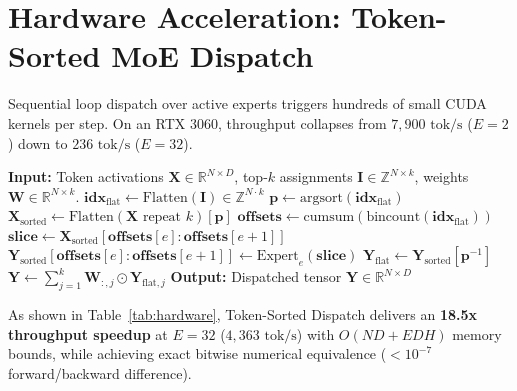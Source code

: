 \documentclass[10pt,twocolumn,letterpaper]{article}
\begin{document}
\section{Hardware Acceleration: Token-Sorted MoE Dispatch}
Sequential loop dispatch over active experts triggers hundreds of small CUDA kernels per step. On an RTX 3060, throughput collapses from $7,900\text{ tok/s}$ ($E=2$) down to $236\text{ tok/s}$ ($E=32$).

\begin{algorithm}[t]
\caption{Vectorized Token-Sorted Batched MoE Dispatch}
\begin{algorithmic}[1]
\State \textbf{Input:} Token activations $\mathbf{X} \in \mathbb{R}^{N \times D}$, top-$k$ assignments $\mathbf{I} \in \mathbb{Z}^{N \times k}$, weights $\mathbf{W} \in \mathbb{R}^{N \times k}$.
\State $\mathbf{idx}_{\text{flat}} \leftarrow \text{Flatten}(\mathbf{I}) \in \mathbb{Z}^{N \cdot k}$
\State $\mathbf{p} \leftarrow \text{argsort}(\mathbf{idx}_{\text{flat}})$ 
\State $\mathbf{X}_{\text{sorted}} \leftarrow \text{Flatten}(\mathbf{X} \text{ repeat } k)[\mathbf{p}]$
\State $\mathbf{offsets} \leftarrow \text{cumsum}(\text{bincount}(\mathbf{idx}_{\text{flat}}))$
    \State $\mathbf{slice} \leftarrow \mathbf{X}_{\text{sorted}}[\mathbf{offsets}[e]:\mathbf{offsets}[e+1]]$
    \State $\mathbf{Y}_{\text{sorted}}[\mathbf{offsets}[e]:\mathbf{offsets}[e+1]] \leftarrow \text{Expert}_e(\mathbf{slice})$
\EndFor
\State $\mathbf{Y}_{\text{flat}} \leftarrow \mathbf{Y}_{\text{sorted}}[\mathbf{p}^{-1}]$ 
\State $\mathbf{Y} \leftarrow \sum_{j=1}^k \mathbf{W}_{:, j} \odot \mathbf{Y}_{\text{flat}, j}$
\State \textbf{Output:} Dispatched tensor $\mathbf{Y} \in \mathbb{R}^{N \times D}$
\end{algorithmic}
\end{algorithm}

As shown in Table~\ref{tab:hardware}, Token-Sorted Dispatch delivers an \textbf{18.5x throughput speedup} at $E=32$ ($4,363\text{ tok/s}$) with $O(N D + E D H)$ memory bounds, while achieving exact bitwise numerical equivalence ($< 10^{-7}$ forward/backward difference).
\end{document}
